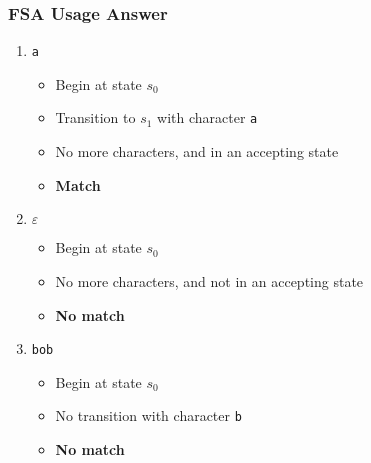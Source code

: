 \documentclass[aspectratio=169]{beamer}
\newenvironment{fsa}{\begin{center}
\begin{tikzpicture}[shorten >=1pt, initial text=]
  \tikzstyle{every state}=[draw=solarizedAccent, node distance=2cm,
                           minimum size=1cm]
  \tikzstyle{accepting}=[double=solarizedRebase03]}{\end{tikzpicture}
\end{center}}
\begin{document}
\begin{frame}
\frametitle{FSA Usage Answer}

\fsausage{}

\begin{enumerate}
  \item \lstinline{a}
    \begin{itemize}
      \item Begin at state $s_0$
      \item Transition to $s_1$ with character \lstinline{a}
      \item No more characters, and in an accepting state
      \item \textbf{Match}
    \end{itemize} 
  \item $\varepsilon$
    \begin{itemize}
      \item Begin at state $s_0$
      \item No more characters, and not in an accepting state
      \item \textbf{No match}
    \end{itemize}
  \item \lstinline{bob}
    \begin{itemize}
      \item Begin at state $s_0$
      \item No transition with character \lstinline{b}
      \item \textbf{No match}
    \end{itemize}
\end{enumerate}
\end{frame}

\end{document}
